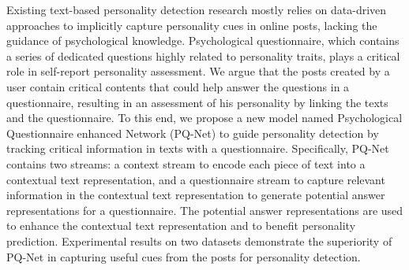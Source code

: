 Existing text-based personality detection research mostly relies on data-driven approaches to implicitly capture personality cues in online posts, lacking the guidance of psychological knowledge. Psychological questionnaire, which contains a series of dedicated questions highly related to personality traits, plays a critical role in self-report personality assessment. We argue that the posts created by a user contain critical contents that could help answer the questions in a questionnaire, resulting in an assessment of his personality by linking the texts and the questionnaire. To this end, we propose a new model named Psychological Questionnaire enhanced Network (PQ-Net) to guide personality detection by tracking critical information in texts with a questionnaire. Specifically, PQ-Net contains two streams: a context stream to encode each piece of text into a contextual text representation, and a questionnaire stream to capture relevant information in the contextual text representation to generate potential answer representations for a questionnaire. The potential answer representations are used to enhance the contextual text representation and to benefit personality prediction. Experimental results on two datasets demonstrate the superiority of PQ-Net in capturing useful cues from the posts for personality detection.

